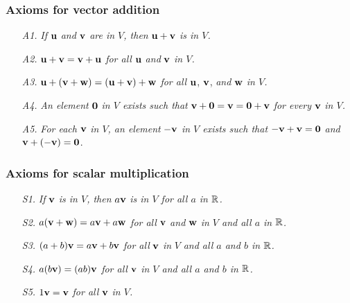 \subsubsection*{Axioms for vector addition}
\vspace{-1em}
\begin{itemize}
\item[\textit{A1.}] \textit{If} $\textbf{u}$ \textit{and} $\textbf{v}$ \textit{are in $V$, then} $\textbf{u} + \textbf{v}$ \textit{is in $V$.}

\item[\textit{A2.}] $\textbf{u} + \textbf{v} = \textbf{v} + \textbf{u}$ \textit{for all} $\textbf{u}$ \textit{and} $\textbf{v}$ \textit{in $V$.}

\item[\textit{A3.}] $\textbf{u} + (\textbf{v} + \textbf{w}) = (\textbf{u} + \textbf{v}) + \textbf{w}$ \textit{for all} $\textbf{u}$, $\textbf{v}$, \textit{and} $\textbf{w}$ \textit{in $V$.}

\item[\textit{A4.}] \textit{An element} $\textbf{0}$ \textit{in $V$ exists such that} $\textbf{v} + \textbf{0} = \textbf{v} = \textbf{0} + \textbf{v}$ \textit{for every} $\textbf{v}$ \textit{in $V$.}

\item[\textit{A5.}] \textit{For each} $\textbf{v}$ \textit{in $V$, an element} $-\textbf{v}$ \textit{in $V$ exists such that} $-\textbf{v} + \textbf{v} = \textbf{0}$ \textit{and} $\textbf{v} + (-\textbf{v}) = \textbf{0}$.

\end{itemize}

\subsubsection*{Axioms for scalar multiplication}
\vspace{-1em}
\begin{itemize}
\item[\textit{S1.}] \textit{If} $\textbf{v}$ \textit{is in $V$, then} $a\textbf{v}$ \textit{is in $V$ for all $a$ in $\mathbb{R}$.}

\item[\textit{S2.}] $a(\textbf{v} + \textbf{w}) = a\textbf{v} + a\textbf{w}$ \textit{for all} $\textbf{v}$ \textit{and} $\textbf{w}$ \textit{in $V$ and all $a$ in $\mathbb{R}$.}

\item[\textit{S3.}] $(a + b)\textbf{v} = a\textbf{v} + b\textbf{v}$ \textit{for all} $\textbf{v}$ \textit{in} $V$ \textit{and all $a$ and $b$ in $\mathbb{R}$.}

\item[\textit{S4.}] $a(b\textbf{v}) = (ab)\textbf{v}$ \textit{for all} $\textbf{v}$ \textit{in $V$ and all $a$ and $b$ in $\mathbb{R}$.}

\item[\textit{S5.}] $1\textbf{v} = \textbf{v}$ \textit{for all} $\textbf{v}$ \textit{in $V$.}

\end{itemize}

